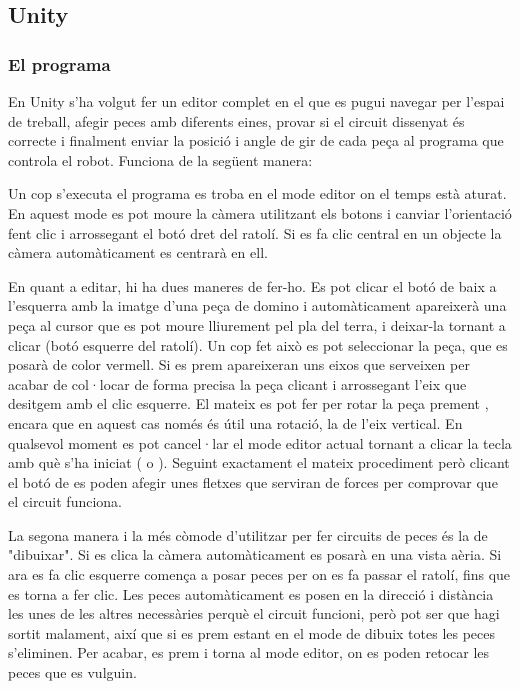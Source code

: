 \newpage
\subsection{Unity}

\subsubsection{El programa}

En Unity s'ha volgut fer un editor complet en el que es pugui navegar per l'espai de treball, afegir peces amb diferents eines, provar si el circuit dissenyat és correcte i finalment enviar la posició i angle de gir de cada peça al programa que controla el robot. Funciona de la següent manera:

Un cop s'executa el programa es troba en el mode editor on el temps està aturat. En aquest mode es pot moure la càmera utilitzant els botons     i canviar l'orientació fent clic i arrossegant el botó dret del ratolí. Si es fa clic central en un objecte la càmera automàticament es centrarà en ell.

En quant a editar, hi ha dues maneres de fer-ho. Es pot clicar el botó de baix a l'esquerra amb la imatge d'una peça de domino i automàticament apareixerà una peça al cursor que es pot moure lliurement pel pla del terra, i deixar-la tornant a clicar (botó esquerre del ratolí). Un cop fet això es pot seleccionar la peça, que es posarà de color vermell. Si es prem  apareixeran uns eixos que serveixen per acabar de col·locar de forma precisa la peça clicant i arrossegant l'eix que desitgem amb el clic esquerre. El mateix es pot fer per rotar la peça prement , encara que en aquest cas només és útil una rotació, la de l'eix vertical. En qualsevol moment es pot cancel·lar el mode editor actual tornant a clicar la tecla amb què s'ha iniciat ( o ). Seguint exactament el mateix procediment però clicant el botó de  es poden afegir unes fletxes que serviran de forces per comprovar que el circuit funciona.

La segona manera i la més còmode d'utilitzar per fer circuits de peces és la de "dibuixar". Si es clica  la càmera automàticament es posarà en una vista aèria. Si ara es fa clic esquerre comença a posar peces per on es fa passar el ratolí, fins que es torna a fer clic. Les peces automàticament es posen en la direcció i distància les unes de les altres necessàries perquè el circuit funcioni, però pot ser que hagi sortit malament, així que si es prem \keys{\del} estant en el mode de dibuix totes les peces s'eliminen. Per acabar, es prem \keys{\esc} i torna al mode editor, on es poden retocar les peces que es vulguin.


